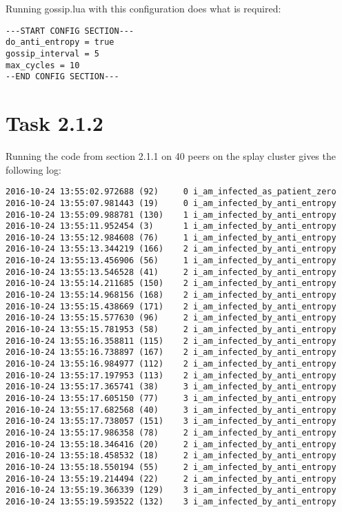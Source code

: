 \documentclass[a4paper]{article}
\begin{document}
Running gossip.lua with this configuration does what is required:

\begin{lstlisting}
---START CONFIG SECTION---
do_anti_entropy = true
gossip_interval = 5
max_cycles = 10
--END CONFIG SECTION---
\end{lstlisting}

\section{Task 2.1.2}

Running the code from section 2.1.1 on 40 peers on the splay cluster gives the following log:
\begin{lstlisting}
2016-10-24 13:55:02.972688 (92)     0 i_am_infected_as_patient_zero
2016-10-24 13:55:07.981443 (19)     0 i_am_infected_by_anti_entropy
2016-10-24 13:55:09.988781 (130)    1 i_am_infected_by_anti_entropy
2016-10-24 13:55:11.952454 (3)      1 i_am_infected_by_anti_entropy
2016-10-24 13:55:12.984608 (76)     1 i_am_infected_by_anti_entropy
2016-10-24 13:55:13.344219 (166)    2 i_am_infected_by_anti_entropy
2016-10-24 13:55:13.456906 (56)     1 i_am_infected_by_anti_entropy
2016-10-24 13:55:13.546528 (41)     2 i_am_infected_by_anti_entropy
2016-10-24 13:55:14.211685 (150)    2 i_am_infected_by_anti_entropy
2016-10-24 13:55:14.968156 (168)    2 i_am_infected_by_anti_entropy
2016-10-24 13:55:15.438669 (171)    2 i_am_infected_by_anti_entropy
2016-10-24 13:55:15.577630 (96)     2 i_am_infected_by_anti_entropy
2016-10-24 13:55:15.781953 (58)     2 i_am_infected_by_anti_entropy
2016-10-24 13:55:16.358811 (115)    2 i_am_infected_by_anti_entropy
2016-10-24 13:55:16.738897 (167)    2 i_am_infected_by_anti_entropy
2016-10-24 13:55:16.984977 (112)    2 i_am_infected_by_anti_entropy
2016-10-24 13:55:17.197953 (113)    2 i_am_infected_by_anti_entropy
2016-10-24 13:55:17.365741 (38)     3 i_am_infected_by_anti_entropy
2016-10-24 13:55:17.605150 (77)     3 i_am_infected_by_anti_entropy
2016-10-24 13:55:17.682568 (40)     3 i_am_infected_by_anti_entropy
2016-10-24 13:55:17.738057 (151)    3 i_am_infected_by_anti_entropy
2016-10-24 13:55:17.986358 (78)     2 i_am_infected_by_anti_entropy
2016-10-24 13:55:18.346416 (20)     2 i_am_infected_by_anti_entropy
2016-10-24 13:55:18.458532 (18)     2 i_am_infected_by_anti_entropy
2016-10-24 13:55:18.550194 (55)     2 i_am_infected_by_anti_entropy
2016-10-24 13:55:19.214494 (22)     2 i_am_infected_by_anti_entropy
2016-10-24 13:55:19.366339 (129)    3 i_am_infected_by_anti_entropy
2016-10-24 13:55:19.593522 (132)    3 i_am_infected_by_anti_entropy

\end{lstlisting}
\end{document}
